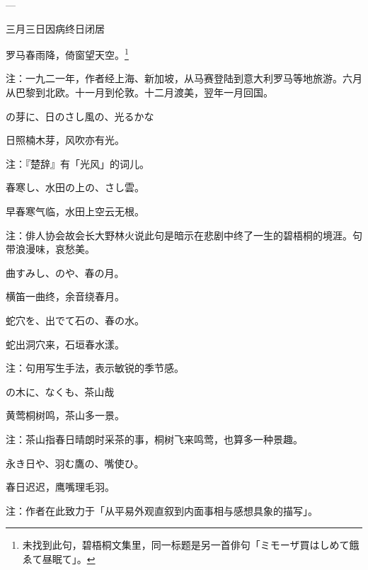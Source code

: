 \setcounter{haikucounter}{0}

\begin{haiku}
    {\FH ---}

    {\FK 三月三日因病终日闭居}

    {\FK 罗马春雨降，倚窗望天空。\footnote{\FT 未找到此句，碧梧桐文集里，同一标题是另一首俳句「{\FM ミモーザ買はしめて餓ゑて昼眠て}」。}}

    {\FT 注：一九二一年，作者经上海、新加坡，从马赛登陆到意大利罗马等地旅游。六月从巴黎到北欧。十一月到伦敦。十二月渡美，翌年一月回国。}
\end{haiku}

\begin{haiku}
    {\FH {}の芽に、日のさし風の、光るかな}

    {\FK 日照楠木芽，风吹亦有光。}

    {\FT 注：『楚辞』有「光风」的词儿。}
\end{haiku}

\begin{haiku}
    {\FH 春寒し、水田の上の、さし雲。}

    {\FK 早春寒气临，水田上空云无根。}

    {\FT 注：俳人协会故会长大野林火说此句是暗示在悲剧中终了一生的碧梧桐的境涯。句带浪漫味，哀愁美。}
\end{haiku}

\begin{haiku}
    {\FH 曲すみし、のや、春の月。}

    {\FK 横笛一曲终，余音绕春月。}
\end{haiku}

\begin{haiku}
    {\FH 蛇穴を、出でて石の、春の水。}

    {\FK 蛇出洞穴来，石垣春水漾。}

    {\FT 注：句用写生手法，表示敏锐的季节感。}
\end{haiku}

\begin{haiku}
    {\FH {}の木に、なくも、茶山哉}

    {\FK 黄莺桐树鸣，茶山多一景。}

    {\FT 注：茶山指春日晴朗时采茶的事，桐树飞来鸣莺，也算多一种景趣。}
\end{haiku}

\begin{haiku}
    {\FH 永き日や、羽む鷹の、嘴使ひ。}

    {\FK 春日迟迟，鹰嘴理毛羽。}

    {\FT 注：作者在此致力于「从平易外观直叙到内面事相与感想具象的描写」。}
\end{haiku}

